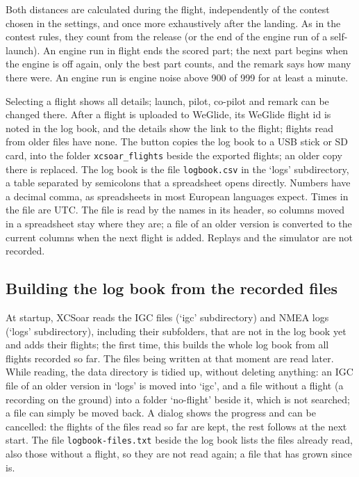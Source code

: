 Both distances are calculated during the flight, independently of the
contest chosen in the settings, and once more exhaustively after the
landing.  As in the contest rules, they count from the release (or the
end of the engine run of a self-launch).  An engine run in flight ends
the scored part; the next part begins when the engine is off again,
only the best part counts, and the remark says how many there were.
An engine run is engine noise above 900 of 999 for at least a minute.

Selecting a flight shows all details; launch, pilot, co-pilot and
remark can be changed there.  After a flight is uploaded to WeGlide, its WeGlide flight id is noted
in the log book, and the details show the link to the flight; flights
read from older files have none.  The button  copies the log
book to a USB stick or SD card, into the folder
\verb|xcsoar_flights| beside the exported flights; an older copy there
is replaced.  The log book is the file
\verb|logbook.csv| in the `logs' subdirectory, a table separated by
semicolons that a spreadsheet opens directly.  Numbers have a decimal
comma, as spreadsheets in most European languages expect.  Times in the
file are UTC.  The file is read by the names in its header, so columns
moved in a spreadsheet stay where they are; a file of an older version
is converted to the current columns when the next flight is added.  Replays and the simulator are not recorded.

\subsection*{Building the log book from the recorded files}

At startup, XCSoar reads the IGC files (`igc' subdirectory) and NMEA
logs (`logs' subdirectory), including their subfolders, that are not in
the log book yet and adds their flights; the first time, this builds
the whole log book from all flights recorded so far.  The files being
written at that moment are read later.  While reading, the data
directory is tidied up, without deleting anything: an IGC file of an
older version in `logs' is moved into `igc', and a file without a
flight (a recording on the ground) into a folder `no-flight' beside
it, which is not searched; a file can simply be moved back.  A dialog shows the progress and can be
cancelled: the flights of the files read so far are kept, the rest
follows at the next start.  The file \verb|logbook-files.txt| beside
the log book lists the files already read, also those without a
flight, so they are not read again; a file that has grown since is.

